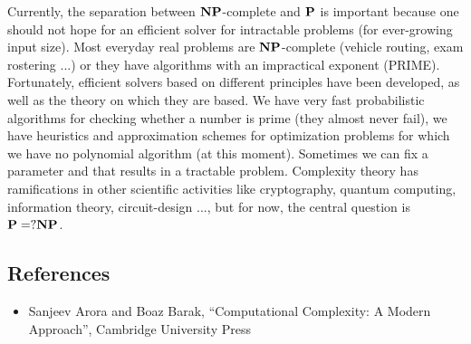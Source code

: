 Currently, the separation between $\NP$-complete and $\P$ is important
because one should not hope for an efficient solver for intractable
problems (for ever-growing input size). Most everyday real problems
are $\NP$-complete (vehicle routing, exam rostering ...) or they have
algorithms with an impractical exponent (PRIME). Fortunately,
efficient solvers based on different principles have been developed,
as well as the theory on which they are based. We have very fast
probabilistic algorithms for checking whether a number is prime (they almost never
fail), we have heuristics and approximation schemes for
optimization problems for which we have no polynomial algorithm (at
this moment). Sometimes we can fix a parameter and that results in a
tractable problem. Complexity theory has ramifications in other
scientific activities like cryptography, quantum computing, information
theory, circuit-design ..., but for now, the central question
is $\P =? \NP$.


\subsection{References}
\begin{itemize}
\item Sanjeev Arora and Boaz Barak, ``Computational Complexity: A Modern Approach'',
Cambridge University Press
\end{itemize}




